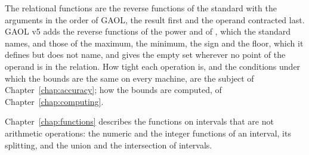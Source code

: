 \medskip
The relational functions are the reverse functions of the standard with the
arguments in the order of GAOL, the result first and the operand contracted
last. GAOL v5 adds the reverse functions of the power and of ,
      which the standard names, and those of the maximum, the minimum, the sign and
      the floor, which it defines but does not name, and gives the empty set wherever no point of the operand
is in the relation.\newinvfive{} How tight each operation is, and the
conditions under which the bounds are the same on every machine, are the
subject of Chapter~\ref{chap:accuracy}; how the bounds are computed, of
Chapter~\ref{chap:computing}.

\medskip
Chapter~\ref{chap:functions} describes the functions on intervals that are
not arithmetic operations: the numeric and the integer functions of an
interval, its splitting, and the union and the intersection of intervals.
